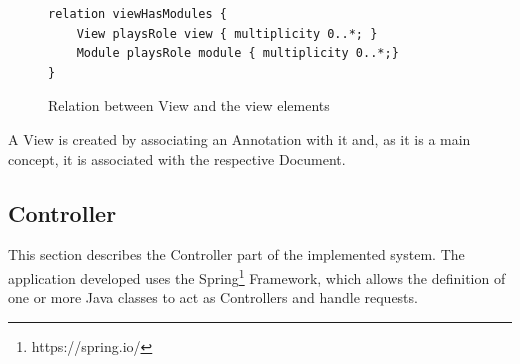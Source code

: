 \documentclass{llncs}
\begin{document}
\begin{figure}
\lstset{style=customjava}
\begin{lstlisting}
relation viewHasModules {
	View playsRole view { multiplicity 0..*; }
	Module playsRole module { multiplicity 0..*;}
}
\end{lstlisting}
\caption{Relation between View and the view elements}
\label{figure:modelviewelements}
\end{figure}

A View is created by associating an Annotation with it and, as it is a main concept, it is associated with the respective Document.

\subsection{Controller}

This section describes the Controller part of the implemented system. The application developed uses the Spring\footnote{https://spring.io/} Framework, which allows the definition of one or more Java classes to act as Controllers and handle requests.
\end{document}
